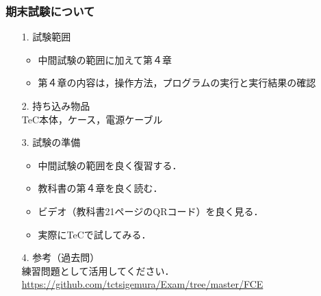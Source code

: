 \documentclass{beamer}                 %
\begin{document}
\begin{frame}
  \frametitle{期末試験について}
  \begin{enumerate}
  \item[1.] 試験範囲
    \begin{itemize}
    \item 中間試験の範囲に加えて第４章
    \item 第４章の内容は，操作方法，プログラムの実行と実行結果の確認
    \end{itemize}
  \item[2.] 持ち込み物品\\
    TeC本体，ケース，電源ケーブル
  \item[3.] 試験の準備 \\
    \begin{itemize}
    \item 中間試験の範囲を良く復習する．
    \item 教科書の第４章を良く読む．
    \item ビデオ（教科書21ページのQRコード）を良く見る．
    \item 実際にTeCで試してみる．
    \end{itemize}
  \item[4.] 参考（過去問） \\
    練習問題として活用してください．\\
    \url{https://github.com/tctsigemura/Exam/tree/master/FCE}
  \end{enumerate}
  \vfill
\end{frame}

\end{document}
